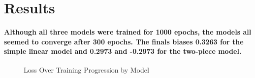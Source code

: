 \documentclass{article}
\begin{document}
\section{Results}
\paragraph{Although all three models were trained for 1000 epochs, the models all seemed to converge after 300 epochs. The finals biases 0.3263 for the simple linear model and 0.2973 and -0.2973 for the two-piece model.}
\begin{figure}[H]
    \centering
    \caption{Loss Over Training Progression by Model}
    \label{fig:bitchandahalf}
\end{figure}
\end{document}

